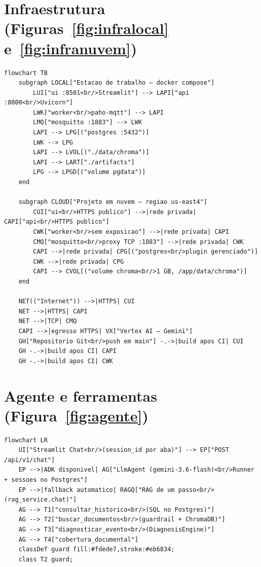 \section{Infraestrutura (Figuras~\ref{fig:infralocal} e~\ref{fig:infranuvem})}

\begin{lstlisting}[language=mermaid, caption={Implantação local e em nuvem}, label={lst:mminfra}]
flowchart TB
    subgraph LOCAL["Estacao de trabalho — docker compose"]
        LUI["ui :8501<br/>Streamlit"] --> LAPI["api :8000<br/>Uvicorn"]
        LWK["worker<br/>paho-mqtt"] --> LAPI
        LMQ["mosquitto :1883"] --> LWK
        LAPI --> LPG[("postgres :5432")]
        LWK --> LPG
        LAPI --> LVOL[("./data/chroma")]
        LAPI --> LART["./artifacts"]
        LPG --> LPGD[("volume pgdata")]
    end

    subgraph CLOUD["Projeto em nuvem — regiao us-east4"]
        CUI["ui<br/>HTTPS publico"] -->|rede privada| CAPI["api<br/>HTTPS publico"]
        CWK["worker<br/>sem exposicao"] -->|rede privada| CAPI
        CMQ["mosquitto<br/>proxy TCP :1883"] -->|rede privada| CWK
        CAPI -->|rede privada| CPG[("postgres<br/>plugin gerenciado")]
        CWK -->|rede privada| CPG
        CAPI --> CVOL[("volume chroma<br/>1 GB, /app/data/chroma")]
    end

    NET(("Internet")) -->|HTTPS| CUI
    NET -->|HTTPS| CAPI
    NET -->|TCP| CMQ
    CAPI -->|egresso HTTPS| VX["Vertex AI — Gemini"]
    GH["Repositorio Git<br/>push em main"] -.->|build apos CI| CUI
    GH -.->|build apos CI| CAPI
    GH -.->|build apos CI| CWK
\end{lstlisting}

\section{Agente e ferramentas (Figura~\ref{fig:agente})}

\begin{lstlisting}[language=mermaid, caption={Agente de conversa e suas quatro ferramentas}, label={lst:mmagente}]
flowchart LR
    UI["Streamlit Chat<br/>(session_id por aba)"] --> EP["POST /api/v1/chat"]
    EP -->|ADK disponivel| AG["LlmAgent (gemini-3.6-flash)<br/>Runner + sessoes no Postgres"]
    EP -->|fallback automatico| RAGQ["RAG de um passo<br/>(rag_service.chat)"]
    AG --> T1["consultar_historico<br/>(SQL no Postgres)"]
    AG --> T2["buscar_documentos<br/>(guardrail + ChromaDB)"]
    AG --> T3["diagnosticar_evento<br/>(DiagnosisEngine)"]
    AG --> T4["cobertura_documental"]
    classDef guard fill:#fdede7,stroke:#eb6834;
    class T2 guard;
\end{lstlisting}

